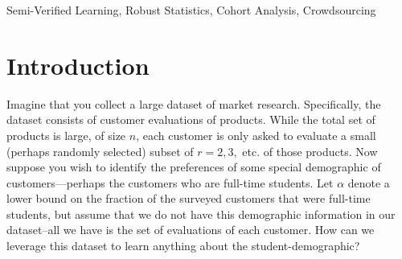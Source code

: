 \documentclass[final,12pt]{colt2018}
\begin{document}
\begin{keywords}
Semi-Verified Learning, Robust Statistics, Cohort Analysis, Crowdsourcing
\end{keywords}


\section{Introduction}
\begin{comment}
Imagine that you have access to a large dataset of market research.  Specifically, the dataset consists of customer evaluations of products. While the total set of products is large, of size $n$, each customer is only asked to evaluate a small (perhaps randomly selected) subset of $r=2,3,$ etc. of those products.   Long after the dataset is collected, suppose  you wish to identify the preferences of some special demographic of customers---perhaps  the customers who are full-time students.  Let $\alpha$ denote a lower bound on the fraction of the surveyed customers that were full-time students, but assume that we do not have this demographic information in our dataset--all we have is the set of evaluations of each customer.   How can we leverage this dataset to learn anything about the student-demographic?
\end{comment}

Imagine that you collect a large dataset of market research.  Specifically, the dataset consists of customer evaluations of products. While the total set of products is large, of size $n$, each customer is only asked to evaluate a small (perhaps randomly selected) subset of $r=2,3,$ etc. of those products.  Now suppose  you wish to identify the preferences of some special demographic of customers---perhaps  the customers who are full-time students.  Let $\alpha$ denote a lower bound on the fraction of the surveyed customers that were full-time students, but assume that we do not have this demographic information in our dataset--all we have is the set of evaluations of each customer.   How can we leverage this dataset to learn anything about the student-demographic?
\end{document}
